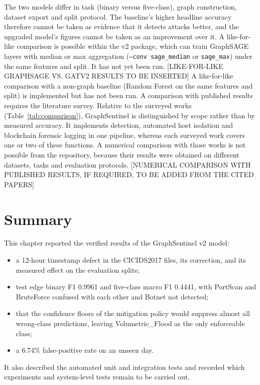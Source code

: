 \documentclass[12pt,a4paper]{report}
\begin{document}
\par The two models differ in task (binary versus five-class), graph construction, dataset export and split protocol. The baseline's higher headline accuracy therefore cannot be taken as evidence that it detects attacks better, and the upgraded model's figures cannot be taken as an improvement over it. A like-for-like comparison is possible within the v2 package, which can train GraphSAGE layers with median or max aggregation (\texttt{--conv sage\_median} or \texttt{sage\_max}) under the same features and split. It has not yet been run. [LIKE-FOR-LIKE GRAPHSAGE VS. GATV2 RESULTS TO BE INSERTED] A like-for-like comparison with a non-graph baseline (Random Forest on the same features and split) is implemented but has not been run. A comparison with published results requires the literature survey.
Relative to the surveyed works (Table~\ref{tab:comparison}), GraphSentinel is distinguished by scope rather than by measured accuracy. It implements detection, automated host isolation and blockchain forensic logging in one pipeline, whereas each surveyed work covers one or two of these functions. A numerical comparison with those works is not possible from the repository, because their results were obtained on different datasets, tasks and evaluation protocols. [NUMERICAL COMPARISON WITH PUBLISHED RESULTS, IF REQUIRED, TO BE ADDED FROM THE CITED PAPERS]
\section{Summary}
\par This chapter reported the verified results of the GraphSentinel v2 model:
\begin{itemize}
    \item a 12-hour timestamp defect in the CICIDS2017 files, its correction, and its measured effect on the evaluation splits;
    \item test edge binary F1 0.9961 and five-class macro F1 0.4441, with PortScan and BruteForce confused with each other and Botnet not detected;
    \item that the confidence floors of the mitigation policy would suppress almost all wrong-class predictions, leaving Volumetric\_Flood as the only enforceable class;
    \item a 6.74\% false-positive rate on an unseen day.
\end{itemize}
It also described the automated unit and integration tests and recorded which experiments and system-level tests remain to be carried out.
\end{document}
